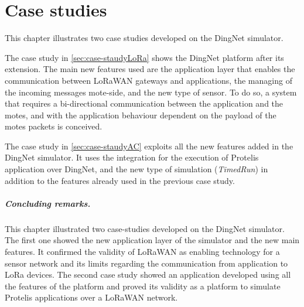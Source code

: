 \chapter{Case studies}
\label{chap:case-studies}
This chapter illustrates two case studies developed on the DingNet simulator.

The case study in \cref{sec:case-staudyLoRa} shows the DingNet platform after its extension.
The main new features used are the application layer that enables the communication between LoRaWAN gateways and applications, the managing of the incoming messages mote-side, and the new type of sensor.  
To do so, a system that requires a bi-directional communication between the application and the motes, and with the application behaviour dependent on the payload of the motes packets is conceived.

The case study in \cref{sec:case-staudyAC} exploits all the new features added in the DingNet simulator.
It uses the integration for the execution of Protelis application over DingNet, and the new type of simulation (\textit{TimedRun}) in addition to the features already used in the previous case study.





\paragraph{Concluding remarks.} This chapter illustrated two case-studies developed on the DingNet simulator.
The first one showed the new application layer of the simulator and the new main features. It confirmed the validity of LoRaWAN as enabling technology for a sensor network and its limits regarding the communication from application to LoRa devices.
The second case study showed an application developed using all the features of the platform and proved its validity as a platform to simulate Protelis applications over a LoRaWAN network.


